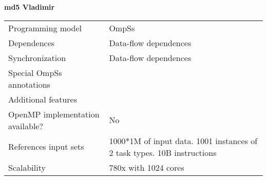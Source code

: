 \section*{}
\label{md5_vladimir}
\centering
\Huge
\textbf{md5 Vladimir}

\begin{table}[h!]
  \large
  \centering
  \begin{tabular}{|l|l|}
    \hline
    Programming model                & OmpSs \\
    Dependences                      & Data-flow dependences \\
    Synchronization                  & Data-flow dependences \\
    Special OmpSs annotations        &  \\
    Additional features              &  \\
    OpenMP implementation available? & No \\
    References input sets            & 1000*1M of input data. 1001 instances of 2 task types. 10B instructions \\
    Scalability                      & 780x with 1024 cores \\
    \hline
  \end{tabular}
\end{table}

\newpage
